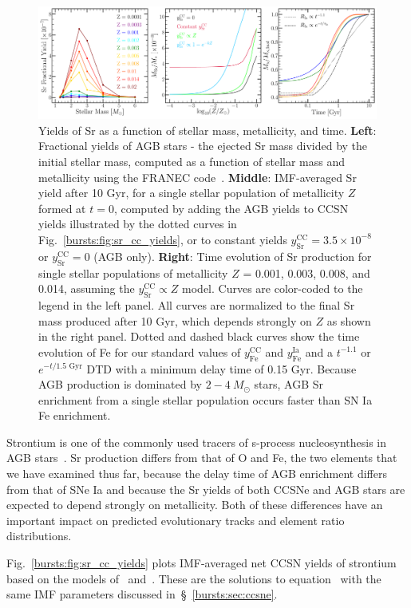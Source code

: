 \begin{figure} %
\includegraphics[scale = 0.32]{sr_yields_ssp.pdf}
\caption{
Yields of Sr as a function of stellar mass, metallicity, and time. 
\textbf{Left}: Fractional yields of AGB stars - the ejected Sr mass divided by 
the initial stellar mass, computed as a function of stellar mass and 
metallicity using the FRANEC code~\citep{Cristallo2011}. \textbf{Middle}: 
IMF-averaged Sr yield after 10 Gyr, for a single stellar population of 
metallicity $Z$ formed at $t = 0$, computed by adding the AGB yields to CCSN 
yields illustrated by the dotted curves in Fig.~\ref{bursts:fig:sr_cc_yields}, or to 
constant yields $y_\text{Sr}^\text{CC} = 3.5\times10^{-8}$ or 
$y_\text{Sr}^\text{CC} = 0$ (AGB only). \textbf{Right}: Time evolution of Sr 
production for single stellar populations of metallicity $Z$ = 0.001, 0.003, 
0.008, and 0.014, assuming the $y_\text{Sr}^\text{CC} \propto Z$ model. 
Curves are color-coded to the legend in the left panel. All curves are 
normalized to the final Sr mass produced after 10 Gyr, which depends strongly 
on $Z$ as shown in the right panel. Dotted and dashed black curves show the 
time evolution of Fe for our standard values of $y_\text{Fe}^\text{CC}$ and 
$y_\text{Fe}^\text{Ia}$ and a $t^{-1.1}$ or $e^{-t/1.5\text{ Gyr}}$ DTD with a 
minimum delay time of 0.15 Gyr. Because AGB production is dominated by 
$2-4\ M_\odot$ stars, AGB Sr enrichment from a single stellar population 
occurs faster than SN Ia Fe enrichment.  
}
\label{bursts:fig:sryields_3panel}
\end{figure}

Strontium is one of the commonly used tracers of s-process nucleosynthesis in 
AGB stars~\citep[e.g.][]{Conroy2013a, Mishenina2019}. Sr production differs from 
that of O and Fe, the two elements that we have examined thus far, because the 
delay time of AGB enrichment differs from that of SNe Ia and because the Sr 
yields of both CCSNe and AGB stars are expected to depend strongly on 
metallicity. Both of these differences have an important impact on predicted 
evolutionary tracks and element ratio distributions. 
\par 
Fig.~\ref{bursts:fig:sr_cc_yields} plots IMF-averaged net CCSN yields of strontium 
based on the models of~\citet{Chieffi2004} and~\citet{Limongi2018}. 
These are the solutions to equation~ with the 
same IMF parameters discussed in~\S~\ref{bursts:sec:ccsne}.


